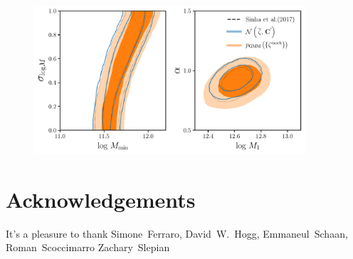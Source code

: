 \documentclass[12pt, letterpaper, preprint]{aastex}
\begin{document}
\begin{figure}
\begin{center}
\includegraphics[width=0.9\textwidth]{figs/GMFcontours_manodeep.pdf}
\caption{}
\label{fig:gmf_contour}
\end{center}
\end{figure}

\section*{Acknowledgements}
It's a pleasure to thank 
    Simone~Ferraro,
    David~W.~Hogg,
    Emmaneul~Schaan, 
    Roman~Scoccimarro
    Zachary~Slepian



\end{document}
